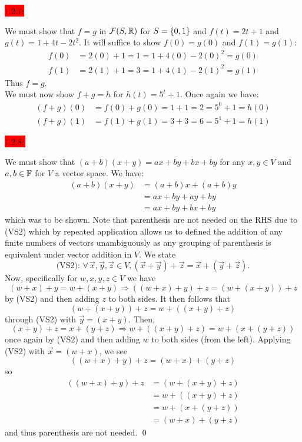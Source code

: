 \documentclass{exam}
\begin{document}
  \colorbox{red}{\underline{$1.2.7$}:}
  \begin{solution}
      We must show that $f = g$ in $\mathcal{F}(S, \mathbb R)$ for $S = \left\{0, 1 \right\}$ and $f(t) = 2t + 1$ and $g(t) = 1 + 4t - 2t^2$. It will suffice to show $f(0) = g(0)$ and $f(1) = g(1)$: 
    \begin{align*}
      f(0) &= 2(0) + 1 = 1 = 1 + 4(0) - 2(0)^{2} = g(0) \\
      f(1) &= 2(1) + 1 = 3 = 1 + 4(1) - 2(1)^2 = g(1)
    \end{align*}
    Thus $f = g$. \\ We must now show $f + g = h$ for $h(t) = 5^{t} + 1$. Once again we have: 
    \begin{align*}
      (f + g)(0) &= f(0) + g(0) = 1 + 1 = 2 = 5^{0} + 1 = h(0) \\
      (f + g)(1) &= f(1) + g(1) = 3 + 3 = 6 = 5^{1} + 1 = h(1) 
    \end{align*}
  \end{solution}

  \colorbox{red}{\underline{$1.2.8:$}} 
  \begin{solution}
    We must show that $(a + b)(x + y) = ax + by + bx + by$ for any $x, y \in V$ and $a, b \in \mathbb F$ for $V$ a vector space. We have:
    \begin{align*}
      (a + b)(x + y) &= (a + b)x + (a + b)y \tag*{(VS7)} \\
      &= ax + by + ay + by \tag*{(VS8)} \\
      &= ax + by + bx + by \tag*{(VS1)}
    \end{align*}
    which was to be shown. Note that parenthesis are not needed on the RHS due to (VS2) which by repeated application allows us to defined the addition of any finite numbers of vectors unambiguously as any grouping of parenthesis is equivalent under vector addition in $V$. We state 
    \[
      \text{(VS2): } \forall\, \vec{x}, \vec{y}, \vec{z} \in V, (\vec{x} + \vec{y}) + \vec{z} = \vec{x} + (\vec{y} + \vec{z}).
    \] Now, specifically for $w, x, y, z \in V$ we have 
    \[
      (w + x) + y = w + (x + y) \Rightarrow ((w + x) + y) + z = (w + (x + y)) + z 
    \]
    by (VS2) and then adding $z$ to both sides. It then follows that 
    \[
      (w + (x + y)) + z = w + ((x + y) + z) 
    \]
    through (VS2) with $\vec{y} = (x + y)$. Then, 
    \[
      (x + y) + z = x + (y + z) \Rightarrow w + ((x + y) + z) = w + (x + (y + z)) 
    \]
    once again by (VS2) and then adding $w$ to both sides (from the left). Applying (VS2) with $\vec{x} = (w + x)$, we see 
    \[
      ((w + x) + y) + z = (w + x) + (y + z) 
    \]
    so 
    \begin{align*}
      ((w + x) + y) + z &= (w + (x + y) + z) \\
      &= w + ((x + y) + z) \\
      &= w + (x + (y + z)) \\
      &= (w + x) + (y + z)
    \end{align*}
    and thus parenthesis are not needed. \qed
  \end{solution}
\end{document}
